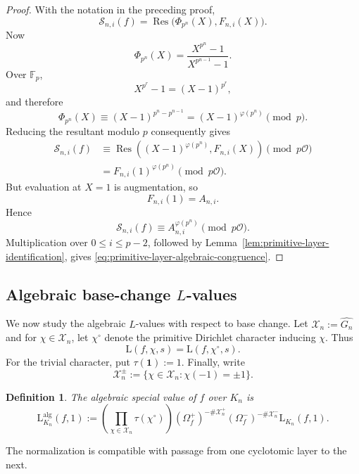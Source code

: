 \documentclass[11pt,table]{amsart}
\newtheorem{definition}[theorem]{Definition}
\newcommand{\F}{\mathbb{F}}
\numberwithin{equation}{section}
\begin{document}
\begin{proof}
With the notation in the preceding proof,
\[
        \mathcal S_{n,i}(f)
        =
        \operatorname{Res}
        \bigl(
        \Phi_{p^n}(X),F_{n,i}(X)
        \bigr).
\]
Now
\[
        \Phi_{p^n}(X)
        =
        \frac{X^{p^n}-1}
             {X^{p^{n-1}}-1}.
\]
Over \(\F_p\),
\[
        X^{p^r}-1=(X-1)^{p^r},
\]
and therefore
\begin{equation}
\label{eq:cyclotomic-polynomial-reduction}
        \Phi_{p^n}(X)
        \equiv
        (X-1)^{p^n-p^{n-1}}
        =
        (X-1)^{\varphi(p^n)}
        \pmod p.
\end{equation}
Reducing the resultant modulo \(p\) consequently gives
\[
\begin{aligned}
        \mathcal S_{n,i}(f)
        &\equiv
        \operatorname{Res}
        \left(
        (X-1)^{\varphi(p^n)},
        F_{n,i}(X)
        \right)
        \pmod{p\mathcal O}\\
        &=
        F_{n,i}(1)^{\varphi(p^n)}
        \pmod{p\mathcal O}.
\end{aligned}
\]
But evaluation at \(X=1\) is augmentation, so
\[
        F_{n,i}(1)=A_{n,i}.
\]
Hence
\[
        \mathcal S_{n,i}(f)
        \equiv
        A_{n,i}^{\varphi(p^n)}
        \pmod{p\mathcal O}.
\]
Multiplication over \(0\leq i\leq p-2\), followed by
Lemma~\ref{lem:primitive-layer-identification}, gives
\eqref{eq:primitive-layer-algebraic-congruence}.
\end{proof}

\subsection{Algebraic base-change \(L\)-values}
\label{subsec:alg-L-stability}

\par We now study the algebraic $L$-values with respect to base change. Let $\mathcal X_n:=\widehat{G_n}$ and for \(\chi\in\mathcal X_n\), let \(\chi^\circ\) denote the primitive
Dirichlet character inducing \(\chi\).  Thus
\[
        \mathrm{L}(f,\chi,s)=\mathrm{L}(f,\chi^\circ,s).
\]
For the trivial character, put $\tau(\mathbf1):=1$. Finally, write
\[
        \mathcal X_n^\pm
        :=
        \{\chi\in\mathcal X_n:\chi(-1)=\pm1\}.
\]

\begin{definition}
\label{def:algebraic-base-change}
The algebraic special value of \(f\) over \(K_n\) is
\begin{equation}
\label{eq:def-algebraic-base-change}
        \mathrm{L}_{K_n}^{\operatorname{alg}}(f,1)
        :=
        \left(
        \prod_{\chi\in\mathcal X_n}
        \tau(\chi^\circ)
        \right)
        (\Omega_f^+)^{-\#\mathcal X_n^+}
        (\Omega_f^-)^{-\#\mathcal X_n^-}
        \mathrm{L}_{K_n}(f,1).
\end{equation}
\end{definition}
\par The normalization is compatible with passage from one cyclotomic
layer to the next.
\end{document}
